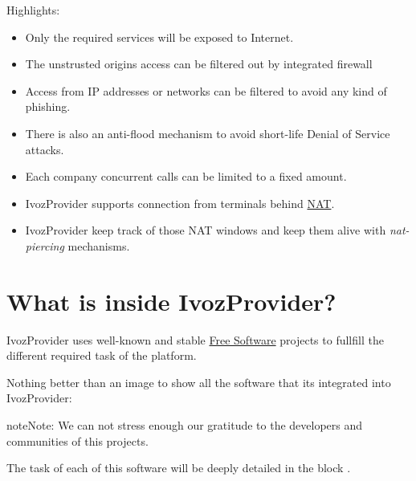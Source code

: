 \documentclass[letterpaper,10pt,english]{sphinxmanual}
\begin{document}
Highlights:
\begin{itemize}
\item {} 
Only the required services will be exposed to Internet.

\item {} 
The unstrusted origins access can be filtered out by integrated firewall

\item {} 
Access from IP addresses or networks can be filtered to avoid any kind of
phishing.

\item {} 
There is also an anti-flood mechanism to avoid short-life Denial of
Service attacks.

\item {} 
Each company concurrent calls can be limited to a fixed amount.

\item {} 
IvozProvider supports connection from terminals behind
\href{https://es.wikipedia.org/wiki/Traducci\%C3\%B3n\_de\_direcciones\_de\_red}{NAT}.

\item {} 
IvozProvider keep track of those NAT windows and keep them alive with
\emph{nat-piercing} mechanisms.

\end{itemize}


\section{What is inside IvozProvider?}
\label{intro/what_is_inside::doc}\label{intro/what_is_inside:what-is-inside-ivozprovider}
IvozProvider uses well-known and stable \href{https://www.gnu.org/philosophy/free-sw.en.html}{Free Software} projects to fullfill
the different required task of the platform.

Nothing better than an image to show all the software that its integrated
into IvozProvider:


\begin{notice}{note}{Note:}
We can not stress enough our gratitude to the developers and communities
of this projects.
\end{notice}

The task of each of this software will be deeply detailed in the block
{\hyperref[architecture/index:architecture]{}}.
\end{document}
